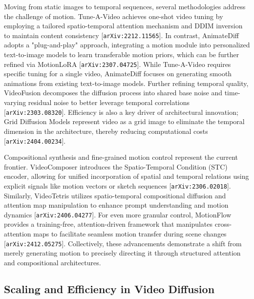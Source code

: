 \documentclass[11pt]{article}
\begin{document}
Moving from static images to temporal sequences, several methodologies address the challenge of motion. Tune-A-Video achieves one-shot video tuning by employing a tailored spatio-temporal attention mechanism and DDIM inversion to maintain content consistency [\texttt{arXiv:2212.11565}]. In contrast, AnimateDiff adopts a "plug-and-play" approach, integrating a motion module into personalized text-to-image models to learn transferable motion priors, which can be further refined via MotionLoRA [\texttt{arXiv:2307.04725}]. While Tune-A-Video requires specific tuning for a single video, AnimateDiff focuses on generating smooth animations from existing text-to-image models. Further refining temporal quality, VideoFusion decomposes the diffusion process into shared base noise and time-varying residual noise to better leverage temporal correlations [\texttt{arXiv:2303.08320}]. Efficiency is also a key driver of architectural innovation; Grid Diffusion Models represent video as a grid image to eliminate the temporal dimension in the architecture, thereby reducing computational costs [\texttt{arXiv:2404.00234}].

Compositional synthesis and fine-grained motion control represent the current frontier. VideoComposer introduces the Spatio-Temporal Condition (STC) encoder, allowing for unified incorporation of spatial and temporal relations using explicit signals like motion vectors or sketch sequences [\texttt{arXiv:2306.02018}]. Similarly, VideoTetris utilizes spatio-temporal compositional diffusion and attention map manipulation to enhance prompt understanding and motion dynamics [\texttt{arXiv:2406.04277}]. For even more granular control, MotionFlow provides a training-free, attention-driven framework that manipulates cross-attention maps to facilitate seamless motion transfer during scene changes [\texttt{arXiv:2412.05275}]. Collectively, these advancements demonstrate a shift from merely generating motion to precisely directing it through structured attention and compositional architectures.

\subsection{Scaling and Efficiency in Video Diffusion}
\end{document}
